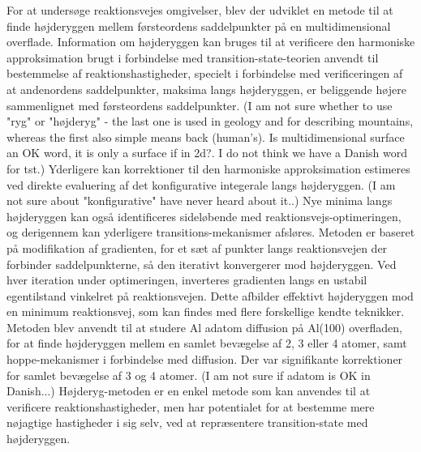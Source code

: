 For at undersøge reaktionsvejes omgivelser, blev der udviklet en metode til at finde højderyggen mellem førsteordens saddelpunkter på en multidimensional overflade.
Information om højderyggen kan bruges til at verificere den harmoniske approksimation brugt i forbindelse med transition-state-teorien anvendt til bestemmelse af reaktionshastigheder, specielt i forbindelse med verificeringen af at andenordens saddelpunkter, maksima langs højderyggen, er beliggende højere sammenlignet med førsteordens saddelpunkter.
(I am not sure whether to use "ryg" or "højderyg" - the last one is used in geology and for describing mountains, whereas the first also simple means back (human's). Is multidimensional surface an OK word, it is only a surface if in 2d?. I do not think we have a Danish word for tst.)
Yderligere kan korrektioner til den harmoniske approksimation estimeres ved direkte evaluering af det konfigurative integerale langs højderyggen. (I am not sure about "konfigurative" have never heard about it..)
Nye minima langs højderyggen kan også identificeres sideløbende med reaktionsvejs-optimeringen, og derigennem kan yderligere transitions-mekanismer afsløres.
Metoden er baseret på modifikation af gradienten, for et sæt af punkter langs reaktionsvejen der forbinder saddelpunkterne, så den iterativt konvergerer mod højderyggen.
Ved hver iteration under optimeringen, inverteres gradienten langs en ustabil egentilstand vinkelret på reaktionsvejen. Dette afbilder effektivt højderyggen mod en minimum reaktionsvej, som kan findes med flere forskellige kendte teknikker.
Metoden blev anvendt til at studere Al adatom diffusion på Al(100) overfladen, for at finde højderyggen mellem en samlet bevægelse af 2, 3 eller 4 atomer, samt hoppe-mekanismer i forbindelse med diffusion.
Der var signifikante korrektioner for samlet bevægelse af 3 og 4 atomer. 
(I am not sure if adatom is OK in Danish...)
Højderyg-metoden er en enkel metode som kan anvendes til at verificere reaktionshastigheder, men har potentialet for at bestemme mere nøjagtige hastigheder i sig selv, ved at repræsentere transition-state med højderyggen.
